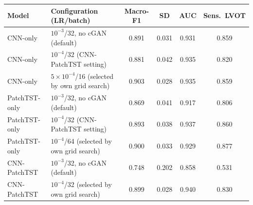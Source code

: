 \begin{tabular}{llcccc}
\toprule
Model & Configuration (LR/batch) & Macro-F1 & SD & AUC & Sens.\ LVOT \\
\midrule
CNN-only & $10^{-3}$/32, no cGAN (default) & 0.891 & 0.031 & 0.931 & 0.859 \\
CNN-only & $10^{-4}$/32 (CNN-PatchTST setting) & 0.881 & 0.042 & 0.935 & 0.820 \\
CNN-only & $5{\times}10^{-4}$/16 (selected by own grid search) & 0.903 & 0.028 & 0.935 & 0.859 \\
\addlinespace
PatchTST-only & $10^{-3}$/32, no cGAN (default) & 0.869 & 0.041 & 0.917 & 0.806 \\
PatchTST-only & $10^{-4}$/32 (CNN-PatchTST setting) & 0.893 & 0.038 & 0.937 & 0.860 \\
PatchTST-only & $10^{-4}$/64 (selected by own grid search) & 0.900 & 0.033 & 0.929 & 0.877 \\
\addlinespace
CNN-PatchTST & $10^{-3}$/32, no cGAN (default) & 0.748 & 0.202 & 0.858 & 0.531 \\
CNN-PatchTST & $10^{-4}$/32 (selected by own grid search) & 0.899 & 0.028 & 0.940 & 0.830 \\
\bottomrule
\end{tabular}
